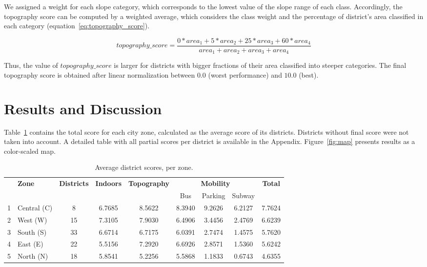 \documentclass[12pt]{article}
\begin{document}
We assigned a weight for each slope category, which corresponds to the lowest value of the slope range of each class. Accordingly, the topography score can be computed by a weighted average, which considers the class weight and the percentage of district's area classified in each category (equation~\ref{eq:topography_score}).

\begin{equation*}
\label{eq:topography_score}
topography\_score = \frac{0*area_1+5*area_2+25*area_3+60*area_4}{area_1+area_2+area_3+area_4}
\end{equation*}

Thus, the value of $topography\_score$ is larger for districts with bigger fractions of their area classified into steeper categories.
The final topography score is obtained after linear normalization between $0.0$ (worst performance) and $10.0$ (best).

\section{Results and Discussion}
\label{sec:results}

Table~\ref{tab:zones1} contains the total score for each city zone,
calculated as the average score of its districts.
Districts without final score were not taken into account.
A detailed table with all partial scores per district is available in the Appendix.
Figure~\ref{fig:map} presents results as a color-scaled map.

\begin{table}[h]
  \small
  \centering
  \begin{tabular}{clccccccc}
    \hline
    & \multirow{2}{*}{\textbf{Zone}}
    & \multirow{2}{*}{\textbf{Districts}}
    & \multirow{2}{*}{\textbf{Indoors}}
    & \multirow{2}{*}{\textbf{Topography}}
    & \multicolumn{3}{c}{\textbf{Mobility}}
    & \multirow{2}{*}{\textbf{Total}}
    \\[0.3ex]
    \cline{6-8}
    \multicolumn{1}{c}{}
    &  &  &  &  & \multicolumn{1}{c}{Bus} & Parking & Subway & \\[0.3ex]
    \hline
    1 & Central (C) & 8  & 6.7685   & 8.5622   & 8.3940   & 9.2626   & 6.2127   & 7.7624  \\
    2 & West    (W) & 15 & 7.3105   & 7.9030   & 6.4906   & 3.4456   & 2.4769   & 6.6239  \\
    3 & South   (S) & 33 & 6.6714   & 6.7175   & 6.0391   & 2.7474   & 1.4575   & 5.7620  \\
    4 & East    (E) & 22 & 5.5156   & 7.2920   & 6.6926   & 2.8571   & 1.5360   & 5.6242  \\
    5 & North   (N) & 18 & 5.8541   & 5.2256   & 5.5868   & 1.1833   & 0.6743   & 4.6355  \\
    \hline

  \end{tabular}
  \caption{Average district scores, per zone.}
  \label{tab:zones1}
\end{table}
\end{document}
